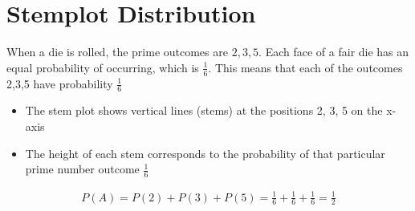 \documentclass[journal]{IEEEtran}
\begin{document}
\section*{Stemplot Distribution}
When a die is rolled, the prime outcomes are ${2,3,5}$. Each face of a fair die has an equal probability of occurring, which is $\frac{1}{6}$. This means that each of the outcomes {2,3,5} have probability $\frac{1}{6}$
\begin{itemize}
    \item The stem plot shows vertical lines (stems) at the positions 2, 3, 5 on the x-axis 
    \item The height of each stem corresponds to the probability of that particular prime number outcome $\frac{1}{6}$
\end{itemize}
\begin{align}
    P(A) = P(2) + P(3) + P(5) = \frac{1}{6}+\frac{1}{6} +\frac{1}{6} = \frac{1}{2}
\end{align}
\end{document}
